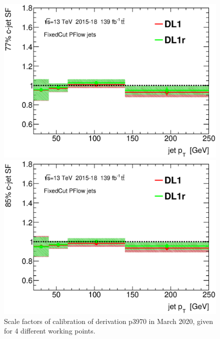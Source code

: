 \documentclass[letterpaper,12pt]{article}
\begin{document}
\begin{figure}[H]
\begin{minipage}[b]{.45\textwidth}
\includegraphics[width=1\textwidth]{SFplots_december/DL1allPFlowDec_DL1rallPFlowDec/SF77.eps}
\end{minipage}\hfill
\begin{minipage}[b]{.45\textwidth}
\centering
\includegraphics[width=1\textwidth]{SFplots_december/DL1allPFlowDec_DL1rallPFlowDec/SF85.eps}
\end{minipage}
\caption{Scale factors of calibration of derivation p3970 in March 2020, given for  4 different working points.} \label{fig:March}
\end{figure}
\end{document}
